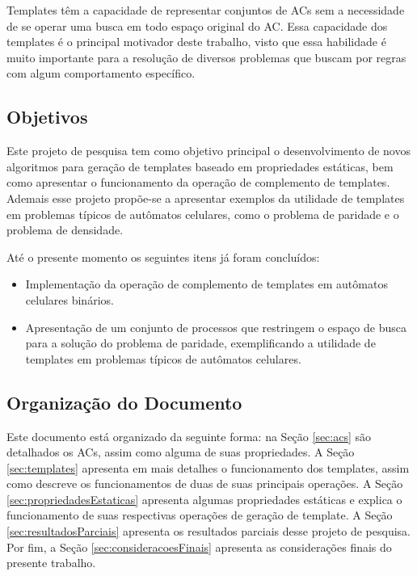 Templates têm a capacidade de representar conjuntos de ACs sem a necessidade de se operar uma busca em todo espaço original do AC. Essa capacidade dos templates é o principal motivador deste trabalho, visto que essa habilidade é muito importante para a resolução de diversos problemas que buscam por regras com algum comportamento específico.

\subsection{Objetivos}
Este projeto de pesquisa tem como objetivo principal o desenvolvimento de novos algoritmos para geração de templates baseado em propriedades estáticas, bem como apresentar o funcionamento da operação de complemento de templates. Ademais esse projeto propõe-se a apresentar exemplos da utilidade de templates em problemas típicos de autômatos celulares, como o problema de paridade e o problema de densidade.

Até o presente momento os seguintes itens já foram concluídos:
      \begin{itemize}
          \item Implementação da operação de complemento de templates em autômatos celulares binários.
          \item Apresentação de um conjunto de processos que restringem o espaço de busca para a solução do problema de paridade, exemplificando a utilidade de templates em problemas típicos de autômatos celulares.
      \end{itemize}

\subsection{Organização do Documento}
Este documento está organizado da seguinte forma: na Seção \ref{sec:acs} são detalhados os ACs, assim como alguma de suas propriedades. A Seção \ref{sec:templates} apresenta em mais detalhes o funcionamento dos templates, assim como descreve os funcionamentos de duas de suas principais operações. A Seção \ref{sec:propriedadesEstaticas} apresenta algumas propriedades estáticas e explica o funcionamento de suas respectivas operações de geração de template. A Seção \ref{sec:resultadosParciais} apresenta os resultados parciais desse projeto de pesquisa. Por fim, a Seção \ref{sec:consideracoesFinais} apresenta as considerações finais do presente trabalho.
